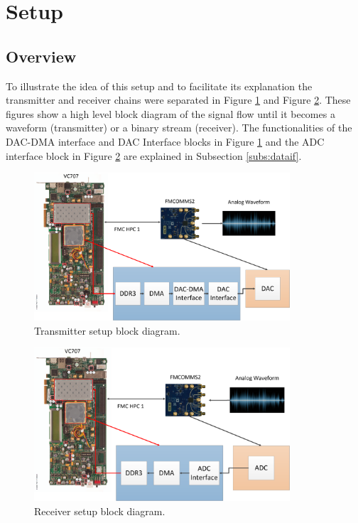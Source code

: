 \section{Setup}
\label{impl:setup}

\subsection{Overview}

To illustrate the idea of this setup and to facilitate its explanation the
transmitter and receiver chains were separated in Figure \ref{fig:txsetup} and
Figure \ref{fig:rxsetup}. These figures show a high level block diagram of the
signal flow until it becomes a waveform (transmitter) or a binary stream
(receiver). The functionalities of the  DAC-DMA interface and DAC Interface
blocks in Figure \ref{fig:txsetup} and the ADC interface block in Figure
\ref{fig:rxsetup} are explained in Subsection \ref{subs:dataif}.

\begin{figure}[htbp]
    \centering
    \includegraphics[width=0.85\textwidth]{./figures/tx_setup}
    \caption{ Transmitter setup block diagram.
    \label{fig:txsetup}}
\end{figure}

\begin{figure}[htbp]
    \centering
    \includegraphics[width=0.85\textwidth]{./figures/rx_setup}
    \caption{ Receiver setup block diagram.
    \label{fig:rxsetup}}
\end{figure}



